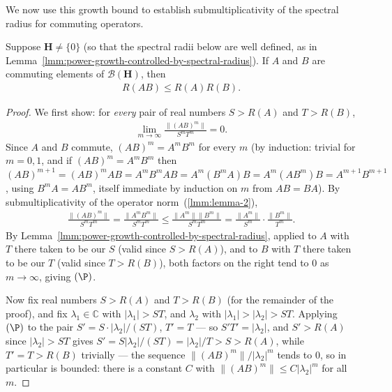 We now use this growth bound to establish submultiplicativity of the spectral radius for commuting operators.

\begin{lemma}
    \label{lmm:hall-10.22}
    \leanok
    Suppose $\mathbf{H} \ne \{0\}$ (so that the spectral radii below are well defined, as in Lemma~\ref{lmm:power-growth-controlled-by-spectral-radius}). If $A$ and $B$ are commuting elements of $\mathcal{B}(\mathbf{H})$, then
    \begin{align}
        R(AB) \le R(A)R(B).
    \end{align}
\end{lemma}
\begin{proof}
    \leanok
We first show: for \textit{every} pair of real numbers $S > R(A)$ and $T > R(B)$,
\begin{align}
    \lim_{m \to \infty} \frac{\|(AB)^m\|}{S^mT^m} = 0. \tag{$\P$}
\end{align}
Since $A$ and $B$ commute, $(AB)^m = A^mB^m$ for every $m$ (by induction: trivial for $m=0,1$, and if $(AB)^m = A^mB^m$ then $(AB)^{m+1} = (AB)^mAB = A^mB^mAB = A^m(B^mA)B = A^m(AB^m)B = A^{m+1}B^{m+1}$, using $B^mA = AB^m$, itself immediate by induction on $m$ from $AB=BA$). By submultiplicativity of the operator norm~(\ref{lmm:lemma-2}),
\begin{align}
    \frac{\|(AB)^m\|}{S^mT^m} = \frac{\|A^mB^m\|}{S^mT^m} \le \frac{\|A^m\|\|B^m\|}{S^mT^m} = \frac{\|A^m\|}{S^m}\cdot\frac{\|B^m\|}{T^m}.
\end{align}
By Lemma~\ref{lmm:power-growth-controlled-by-spectral-radius}, applied to $A$ with $T$ there taken to be our $S$ (valid since $S > R(A)$), and to $B$ with $T$ there taken to be our $T$ (valid since $T > R(B)$), both factors on the right tend to $0$ as $m \to \infty$, giving $(\P)$.

Now fix real numbers $S > R(A)$ and $T > R(B)$ (for the remainder of the proof), and fix $\lambda_1 \in \mathbb{C}$ with $\lvert \lambda_1 \rvert > ST$, and $\lambda_2$ with $\lvert \lambda_1 \rvert > \lvert \lambda_2 \rvert > ST$. Applying $(\P)$ to the pair $S' = S \cdot \lvert \lambda_2 \rvert/(ST)$, $T' = T$ — so $S'T' = \lvert \lambda_2 \rvert$, and $S' > R(A)$ since $\lvert \lambda_2 \rvert > ST$ gives $S' = S\lvert \lambda_2 \rvert/(ST) = \lvert \lambda_2 \rvert/T > S > R(A)$, while $T' = T > R(B)$ trivially — the sequence $\|(AB)^m\|/\lvert \lambda_2 \rvert^m$ tends to $0$, so in particular is bounded: there is a constant $C$ with $\|(AB)^m\| \le C\lvert \lambda_2 \rvert^m$ for all $m$.


\end{proof}
